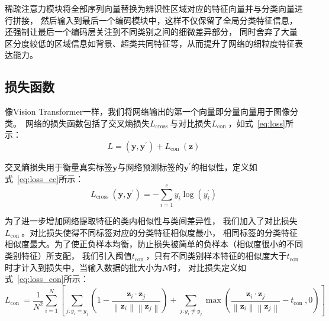 稀疏注意力模块将全部序列向量替换为辨识性区域对应的特征向量并与分类向量进行拼接，
然后输入到最后一个编码模块中，这样不仅保留了全局分类特征信息，还强制让最后一个编码层关注到不同类别之间的细微差异部分，
同时舍弃了大量区分度较低的区域信息如背景、超类共同特征等，从而提升了网络的细粒度特征表达能力。

\subsection{损失函数}
像Vision Transformer一样，我们将网络输出的第一个向量即分量向量用于图像分类。\
网络的损失函数包括了交叉熵损失$L_{\text {cross }}$与对比损失$L_{\text {con }}$，如式~\ref{eq:loss}所示：
\begin{equation}
  L=\left(\boldsymbol{y}, \boldsymbol{y}^{\prime}\right)+L_{\text {con }}(\mathbf{z})
  \label{eq:loss}
\end{equation}

交叉熵损失用于衡量真实标签$\boldsymbol{y}$与网络预测标签的$\boldsymbol{y}^{\prime}$的相似性，定义如式~\ref{eq:loss_ce}所示：
\begin{equation}
  L_{\text {cross }}\left(\boldsymbol{y}, \boldsymbol{y}^{\prime}\right)=-\sum_{i=1}^{c} y_{i} \log \left(y_{i}^{\prime}\right)
  \label{eq:loss_ce}
\end{equation}

为了进一步增加网络提取特征的类内相似性与类间差异性，
我们加入了对比损失$L_{\text {con }}$\cite{hadsell2006dimensionality}。对比损失使得不同标签对应的分类特征相似度最小，
相同标签的分类特征相似度最大。为了使正负样本均衡，防止损失被简单的负样本（相似度很小的不同类别特征）所支配，
我们引入阈值$t_{\text {con }}$，只有不同类别样本特征的相似度大于$t_{\text {con }}$时才计入到损失中，当输入数据的批大小为$N$时，
对比损失定义如式~\ref{eq:loss_con}所示：
\begin{equation}
  L_{\text {con }}=\frac{1}{N^{2}} \sum_{i=1}^{N}\left[\sum_{j: y_{i}=y_{j}}\left(1-\frac{\mathbf{z}_{i} \cdot \mathbf{z}_{j}}{\left\|\mathbf{z}_{i}\right\|\left\|\mathbf{z}_{j}\right\|}\right)+\sum_{j: y_{i} \neq y_{j}} \max \left(\frac{\mathbf{z}_{i} \cdot \mathbf{z}_{j}}{\left\|\mathbf{z}_{i}\right\|\left\|\mathbf{z}_{j}\right\|}-t_{\text {con }}, 0\right)\right]
  \label{eq:loss_con}
\end{equation}




